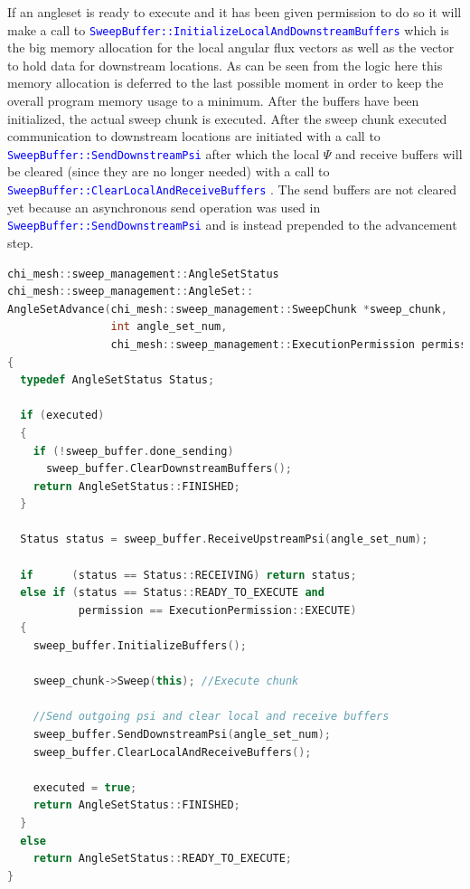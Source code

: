 \documentclass[11pt,letterpaper,titlepage]{article}
\newcommand{\xmltag}[1]{\textcolor{blue}{ \texttt{#1}} }
\numberwithin{equation}{section}
\begin{document}
If an angleset is ready to execute and it has been given permission to do so it will make a call to
\xmltag{SweepBuffer::InitializeLocalAndDownstreamBuffers} which is the big memory allocation for the local angular flux vectors as well as the vector to hold data for downstream locations. As can be seen from the logic here this memory allocation is deferred to the last possible moment in order to keep the overall program memory usage to a minimum. After the buffers have been initialized, the actual sweep chunk is executed.
\newline
\newline
After the sweep chunk executed communication to downstream locations are initiated with a call to \xmltag{SweepBuffer::SendDownstreamPsi} after which the local $\Psi$ and receive buffers will be cleared (since they are no longer needed) with a call to \xmltag{SweepBuffer::ClearLocalAndReceiveBuffers}. The send buffers are not cleared yet because an asynchronous send operation was used in \xmltag{SweepBuffer::SendDownstreamPsi} and is instead prepended to the advancement step.
\newline 
\begin{lstlisting}[language=c++]
chi_mesh::sweep_management::AngleSetStatus
chi_mesh::sweep_management::AngleSet::
AngleSetAdvance(chi_mesh::sweep_management::SweepChunk *sweep_chunk,
                int angle_set_num,
                chi_mesh::sweep_management::ExecutionPermission permission)
{
  typedef AngleSetStatus Status;

  if (executed)
  {
    if (!sweep_buffer.done_sending)
      sweep_buffer.ClearDownstreamBuffers();
    return AngleSetStatus::FINISHED;
  }

  Status status = sweep_buffer.ReceiveUpstreamPsi(angle_set_num);

  if      (status == Status::RECEIVING) return status;
  else if (status == Status::READY_TO_EXECUTE and
           permission == ExecutionPermission::EXECUTE)
  {
    sweep_buffer.InitializeBuffers();

    sweep_chunk->Sweep(this); //Execute chunk

    //Send outgoing psi and clear local and receive buffers
    sweep_buffer.SendDownstreamPsi(angle_set_num);
    sweep_buffer.ClearLocalAndReceiveBuffers();

    executed = true;
    return AngleSetStatus::FINISHED;
  }
  else
    return AngleSetStatus::READY_TO_EXECUTE;
}
\end{lstlisting}
\end{document}
